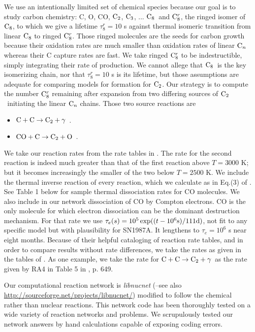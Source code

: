 \documentclass[manuscript]{aastex}
\newcommand{\ctwo}{{\rm C}_2}
\newcommand{\cthree}{{\rm C}_3}
\newcommand{\ceight}{{\rm C}_8}
\newcommand{\ceightr}{{\rm C}_8^r}
\newcommand{\cenn}{{\rm C}_n}
\newcommand{\twoctoctwo}{${\rm C} + {\rm C} \to \ctwo + \gamma$}
\newcommand{\coctoctwo}{${\rm CO} + {\rm C} \to \ctwo + {\rm O}$}
\begin{document}
We use an intentionally limited set of chemical species because our goal is
to study carbon chemistry: C, O, CO, $\ctwo$, $\cthree$, ... $\ceight$\ and
$\ceightr$, the ringed isomer of $\ceight$, to which we give a lifetime
$\tau_8^r = 10$ s against thermal isomeric transition
from linear $\ceight$ to ringed $\ceightr$.
Those ringed molecules are the seeds for carbon
growth because their oxidation rates are much smaller than oxidation rates of
linear $\cenn$
whereas their C capture rates are fast. We take ringed $\ceightr$ to be
indestructible, simply integrating their rate of production.
We cannot allege that $\ceight$\ is the key isomerizing chain, nor that
$\tau_8^r = 10$ s is its lifetime, but those assumptions are adequate for
comparing models for formation for $\ctwo$.
Our strategy is
to compute the number $\ceightr$ remaining after expansion from two differing
sources of $\ctwo$\ initiating the linear $\cenn$
chains. Those two source reactions are
\begin{itemize}
\item \twoctoctwo\ \citep{1999Sci...283.1290C}.
\item \coctoctwo\ \citep{2009ApJ...703..642C,2010ApJ...713....1C}.
\end{itemize}
We take our reaction rates from the rate tables in
\citet{2009ApJ...703..642C,2010ApJ...713....1C}.
The rate for the second reaction is indeed
much greater than that of the first reaction above $T=3000$ K;
but it becomes increasingly the smaller of the two below $T=2500$ K.
We include the thermal inverse reaction of every reaction,
which we calculate as in Eq.(3) of \citet{2001ApJ...562..480C}.
See Table 1 below for sample thermal dissociation rates for CO molecules.
We also include in our network dissociation of CO by Compton electrons.
CO is the only molecule for which electron dissociation can be the dominant
destruction mechanism. For that rate we use
$\tau_e (s) = 10^5 \exp( (t-10^6{\rm s}) / 111 {\rm d} )$,
not fit to any specific model but with plausibility for SN1987A.
It lengthens to $\tau_e = 10^6$ s near eight months.
Because of their helpful cataloging of reaction rate tables,
and in order to compare results without rate differences, we take the
rates as given in the tables of
\citet{2009ApJ...703..642C,2010ApJ...713....1C}.
As one example, we take the rate for \twoctoctwo\
as the rate given by RA4 in Table 5 in \citet{2009ApJ...703..642C}, p. 649.

Our computational reaction network is {\em libnucnet}
(\citealp{2007M&PSA..42.5215M}--see also
\url{http://sourceforge.net/projects/libnucnet/}) modified to follow
the chemical rather than nuclear reactions.
This network code has been thoroughly tested
on a wide variety of reaction networks and problems.
We scrupulously tested our network answers by hand calculations capable of
exposing coding errors.
\end{document}
